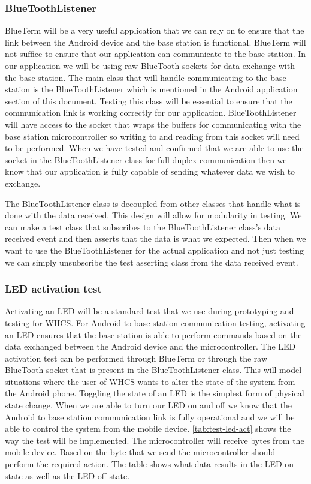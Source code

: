 \subsubsection{BlueToothListener}
BlueTerm will be a very useful application that we can rely on to ensure that
the link between the Android device and the base station is functional.
BlueTerm will not suffice to ensure that our application can communicate to the
base station. In our application we will be using raw BlueTooth sockets for
data exchange with the base station. The main class that will handle
communicating to the base station is the BlueToothListener which is mentioned
in the Android application section of this document. Testing this class will be
essential to ensure that the communication link is working correctly for our
application. BlueToothListener will have access to the socket that wraps the
buffers for communicating with the base station microcontroller so writing to
and reading from this socket will need to be performed. When we have tested and
confirmed that we are able to use the socket in the BlueToothListener class for
full{}-duplex communication then we know that our application is fully capable
of sending whatever data we wish to exchange.

The BlueToothListener class is decoupled from other classes that handle what is
done with the data received. This design will allow for modularity in testing.
We can make a test class that subscribes to the BlueToothListener class{}'s
data received event and then asserts that the data is what we expected. Then
when we want to use the BlueToothListener for the actual application and not
just testing we can simply unsubscribe the test asserting class from the data
received event.

\subsubsection{LED activation test}
Activating an LED will be a standard test that we use during prototyping and
testing for WHCS. For Android to base station communication testing, activating
an LED ensures that the base station is able to perform commands based on the
data exchanged between the Android device and the microcontroller. The LED
activation test can be performed through BlueTerm or through the raw BlueTooth
socket that is present in the BlueToothListener class. This will model
situations where the user of WHCS wants to alter the state of the system from
the Android phone. Toggling the state of an LED is the simplest form of
physical state change. When we are able to turn our LED on and off we know that
the Android to base station communication link is fully operational and we will
be able to control the system from the mobile device.  \autoref{tab:test-led-act}
shows the way the test will be implemented. The microcontroller will receive
bytes from the mobile device. Based on the byte that we send the
microcontroller should perform the required action. The table shows what data
results in the LED on state as well as the LED off state.

